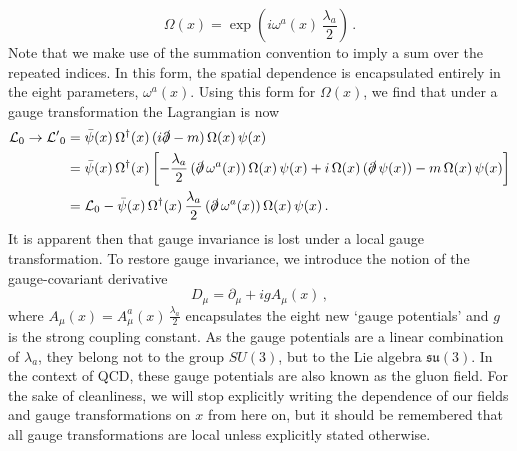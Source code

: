 %
\begin{equation}
\Omega(x)=\exp\left(i\omega^a(x)\,\frac{\lambda_a}{2}\right)\, .
\label{eq:LocalGaugeTransformation}
\end{equation}
%
Note that we make use of the summation convention to imply a sum over the repeated indices. In this form, the spatial dependence is encapsulated entirely in the eight parameters, $\omega^a(x)$.  Using this form for $\Omega(x)$, we find that under a gauge transformation the Lagrangian is now
%
\begin{align}
\mathcal{L}_0\rightarrow\mathcal{L^\prime}_0&=\bar{\psi}(x)\,\Omega^\dag(x)\,(i\slashed{\partial}-m)\,\Omega(x)\,\psi(x)\nonumber\\
&=\bar{\psi}(x)\,\Omega^\dag(x)\left[-\frac{\lambda_a}{2}\,(\slashed{\partial}\,\omega^a(x))\,\Omega(x)\,\psi(x)+ i\,\Omega(x)\,(\slashed{\partial}\,\psi(x))-m\,\Omega(x)\,\psi(x)\right]\nonumber\\
&= \mathcal{L}_0-\bar{\psi}(x)\,\Omega^\dag(x)\,\frac{\lambda_a}{2}\,(\slashed{\partial}\,\omega^a(x))\,\Omega(x)\,\psi(x)\, .
\label{eq:LocalTrans}
\end{align}
%
It is apparent then that gauge invariance is lost under a local gauge transformation. To restore gauge invariance, we introduce the notion of the gauge-covariant derivative
%
\begin{equation}
D_\mu = \partial_\mu + ig A_\mu(x)\, ,
\label{eq:CovariantDerivative}
\end{equation}
%
where $A_\mu(x)=A_\mu^a(x)\,\frac{\lambda_a}{2}$ encapsulates the eight new `gauge potentials' and $g$ is the strong coupling constant. As the gauge potentials are a linear combination of $\lambda_a$, they belong not to the group $SU(3)$, but to the Lie algebra $\mathfrak{su}(3)$. In the context of QCD, these gauge potentials are also known as the gluon field. For the sake of cleanliness, we will stop explicitly writing the dependence of our fields and gauge transformations on $x$ from here on, but it should be remembered that all gauge transformations are local unless explicitly stated otherwise.\\

